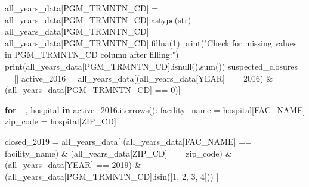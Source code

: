 \documentclass[
  letterpaper,
  DIV=11,
  numbers=noendperiod]{scrartcl}
\newenvironment{Shaded}{\begin{snugshade}}{\end{snugshade}}
\newcommand{\BuiltInTok}[1]{\textcolor[rgb]{0.00,0.23,0.31}{#1}}
\newcommand{\ControlFlowTok}[1]{\textcolor[rgb]{0.00,0.23,0.31}{\textbf{#1}}}
\newcommand{\DecValTok}[1]{\textcolor[rgb]{0.68,0.00,0.00}{#1}}
\newcommand{\KeywordTok}[1]{\textcolor[rgb]{0.00,0.23,0.31}{\textbf{#1}}}
\newcommand{\NormalTok}[1]{\textcolor[rgb]{0.00,0.23,0.31}{#1}}
\newcommand{\OperatorTok}[1]{\textcolor[rgb]{0.37,0.37,0.37}{#1}}
\newcommand{\StringTok}[1]{\textcolor[rgb]{0.13,0.47,0.30}{#1}}
\begin{document}
\begin{Shaded}
\begin{Highlighting}[]
\NormalTok{all\_years\_data[}\StringTok{\textquotesingle{}PGM\_TRMNTN\_CD\textquotesingle{}}\NormalTok{] }\OperatorTok{=}\NormalTok{ all\_years\_data[}\StringTok{\textquotesingle{}PGM\_TRMNTN\_CD\textquotesingle{}}\NormalTok{].astype(}\BuiltInTok{str}\NormalTok{)}
\NormalTok{all\_years\_data[}\StringTok{\textquotesingle{}PGM\_TRMNTN\_CD\textquotesingle{}}\NormalTok{] }\OperatorTok{=}\NormalTok{ all\_years\_data[}\StringTok{\textquotesingle{}PGM\_TRMNTN\_CD\textquotesingle{}}\NormalTok{].fillna(}\StringTok{\textquotesingle{}1\textquotesingle{}}\NormalTok{)}
\BuiltInTok{print}\NormalTok{(}\StringTok{"Check for missing values in PGM\_TRMNTN\_CD column after filling:"}\NormalTok{)}
\BuiltInTok{print}\NormalTok{(all\_years\_data[}\StringTok{\textquotesingle{}PGM\_TRMNTN\_CD\textquotesingle{}}\NormalTok{].isnull().}\BuiltInTok{sum}\NormalTok{()) }
\NormalTok{suspected\_closures }\OperatorTok{=}\NormalTok{ []}
\NormalTok{active\_2016 }\OperatorTok{=}\NormalTok{ all\_years\_data[(all\_years\_data[}\StringTok{\textquotesingle{}YEAR\textquotesingle{}}\NormalTok{] }\OperatorTok{==} \DecValTok{2016}\NormalTok{) }\OperatorTok{\&}\NormalTok{ (all\_years\_data[}\StringTok{\textquotesingle{}PGM\_TRMNTN\_CD\textquotesingle{}}\NormalTok{] }\OperatorTok{==} \StringTok{\textquotesingle{}0\textquotesingle{}}\NormalTok{)]}

\ControlFlowTok{for}\NormalTok{ \_, hospital }\KeywordTok{in}\NormalTok{ active\_2016.iterrows():}
\NormalTok{    facility\_name }\OperatorTok{=}\NormalTok{ hospital[}\StringTok{\textquotesingle{}FAC\_NAME\textquotesingle{}}\NormalTok{]}
\NormalTok{    zip\_code }\OperatorTok{=}\NormalTok{ hospital[}\StringTok{\textquotesingle{}ZIP\_CD\textquotesingle{}}\NormalTok{]}
    
\NormalTok{    closed\_2019 }\OperatorTok{=}\NormalTok{ all\_years\_data[}
\NormalTok{        (all\_years\_data[}\StringTok{\textquotesingle{}FAC\_NAME\textquotesingle{}}\NormalTok{] }\OperatorTok{==}\NormalTok{ facility\_name) }\OperatorTok{\&}
\NormalTok{        (all\_years\_data[}\StringTok{\textquotesingle{}ZIP\_CD\textquotesingle{}}\NormalTok{] }\OperatorTok{==}\NormalTok{ zip\_code) }\OperatorTok{\&}
\NormalTok{        (all\_years\_data[}\StringTok{\textquotesingle{}YEAR\textquotesingle{}}\NormalTok{] }\OperatorTok{==} \DecValTok{2019}\NormalTok{) }\OperatorTok{\&}
\NormalTok{        (all\_years\_data[}\StringTok{\textquotesingle{}PGM\_TRMNTN\_CD\textquotesingle{}}\NormalTok{].isin([}\StringTok{\textquotesingle{}1\textquotesingle{}}\NormalTok{, }\StringTok{\textquotesingle{}2\textquotesingle{}}\NormalTok{, }\StringTok{\textquotesingle{}3\textquotesingle{}}\NormalTok{, }\StringTok{\textquotesingle{}4\textquotesingle{}}\NormalTok{]))}
\NormalTok{    ]}
    

\end{Highlighting}
\end{Shaded}
\end{document}
